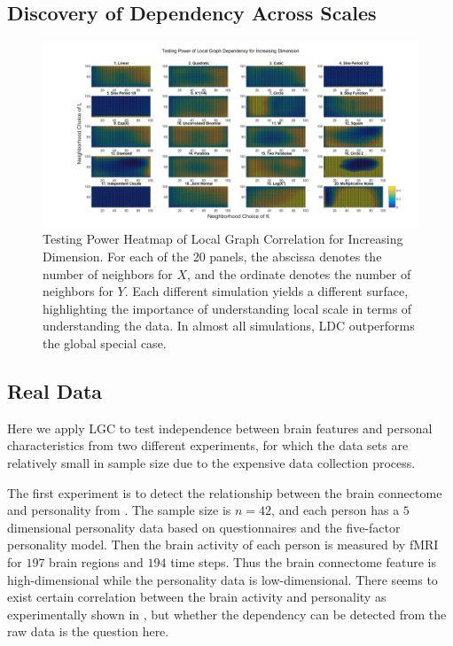 \documentclass[11pt]{article}
\begin{document}
\subsection{Discovery of Dependency Across Scales}

\begin{figure}[htbp]
\includegraphics[width=1.0\textwidth]{../Figures/Fig6s}
\caption{Testing Power Heatmap of Local Graph Correlation for Increasing Dimension.
For each of the 20 panels, the abscissa denotes the number of neighbors for $X$, and the ordinate denotes the number of neighbors for $Y$.  Each different simulation yields a different surface, highlighting the importance of understanding local scale in terms of understanding the data. In almost all simulations, LDC outperforms the global special case.}
\label{figSim2}
\end{figure}







\subsection{Real Data}
\label{numer2}
Here we apply LGC to test independence between brain features and personal characteristics from two different experiments, for which the data sets are relatively small in sample size due to the expensive data collection process. 

The first experiment is to detect the relationship between the brain connectome and personality from \cite{AdelsteinEtAl2011}. The sample size is $n=42$, and each person has a $5$ dimensional personality data based on questionnaires and the five-factor personality model. Then the brain activity of each person is measured by fMRI for $197$ brain regions and $194$ time steps. Thus the brain connectome feature is high-dimensional while the personality data is low-dimensional. There seems to exist certain correlation between the brain activity and personality as experimentally shown in \cite{AdelsteinEtAl2011}, but whether the dependency can be detected from the raw data is the question here.
\end{document}
